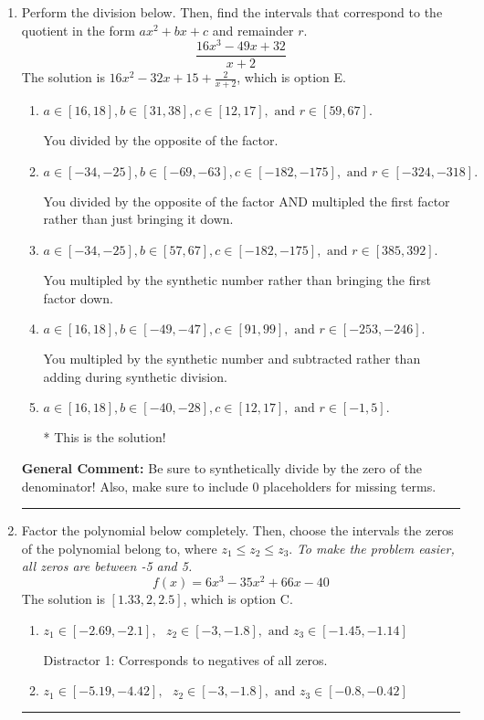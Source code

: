 \documentclass{extbook}[14pt]
\newcommand{\litem}[1]{\item #1

\rule{\textwidth}{0.4pt}}
\begin{document}
\begin{enumerate}\litem{
Perform the division below. Then, find the intervals that correspond to the quotient in the form $ax^2+bx+c$ and remainder $r$.
\[ \frac{16x^{3} -49 x + 32}{x + 2} \]The solution is \( 16x^{2} -32 x + 15 + \frac{2}{x + 2} \), which is option E.\begin{enumerate}[label=\Alph*.]
\item \( a \in [16, 18], b \in [31, 38], c \in [12, 17], \text{ and } r \in [59, 67]. \)

 You divided by the opposite of the factor.
\item \( a \in [-34, -25], b \in [-69, -63], c \in [-182, -175], \text{ and } r \in [-324, -318]. \)

 You divided by the opposite of the factor AND multipled the first factor rather than just bringing it down.
\item \( a \in [-34, -25], b \in [57, 67], c \in [-182, -175], \text{ and } r \in [385, 392]. \)

 You multipled by the synthetic number rather than bringing the first factor down.
\item \( a \in [16, 18], b \in [-49, -47], c \in [91, 99], \text{ and } r \in [-253, -246]. \)

 You multipled by the synthetic number and subtracted rather than adding during synthetic division.
\item \( a \in [16, 18], b \in [-40, -28], c \in [12, 17], \text{ and } r \in [-1, 5]. \)

* This is the solution!
\end{enumerate}

\textbf{General Comment:} Be sure to synthetically divide by the zero of the denominator! Also, make sure to include 0 placeholders for missing terms.
}
\litem{
Factor the polynomial below completely. Then, choose the intervals the zeros of the polynomial belong to, where $z_1 \leq z_2 \leq z_3$. \textit{To make the problem easier, all zeros are between -5 and 5.}
\[ f(x) = 6x^{3} -35 x^{2} +66 x -40 \]The solution is \( [1.33, 2, 2.5] \), which is option C.\begin{enumerate}[label=\Alph*.]
\item \( z_1 \in [-2.69, -2.1], \text{   }  z_2 \in [-3, -1.8], \text{   and   } z_3 \in [-1.45, -1.14] \)

 Distractor 1: Corresponds to negatives of all zeros.
\item \( z_1 \in [-5.19, -4.42], \text{   }  z_2 \in [-3, -1.8], \text{   and   } z_3 \in [-0.8, -0.42] \)


\end{enumerate}}
\end{enumerate}
\end{document}
